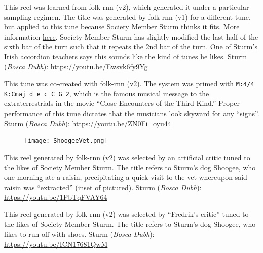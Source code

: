 \documentclass[a4paper,notitlepage,twoside]{book}
\begin{document}
{}  
\hypertarget{reel:MickeyFitternalys}{}
This reel was learned from folk-rnn (v2),
which generated it under a particular sampling regimen.
The title was generated by folk-rnn (v1) for a different tune, 
but applied to this tune because Society Member Sturm thinks it fits.
More information \href{https://highnoongmt.wordpress.com/2019/08/19/making-sense-of-the-folk-rnn-v2-model-part-11/}{here}.
Society Member Sturm has slightly modified the last half of the sixth bar of the turn 
such that it repeats the 2nd bar of the turn. 
One of Sturm's Irish accordion teachers says this sounds like the kind of tunes he likes.
Sturm ({\em Bosca Dubh}): \url{https://youtu.be/Ewsvk6fy9Yg}

{}  
\hypertarget{reel:CloseEncountersReel}{}
This tune was co-created with folk-rnn (v2).
The system was primed with {\tt M:4/4 K:Cmaj d e c C G 2},
which is the famous musical message to the extraterrestrials in 
the movie ``Close Encounters of the Third Kind.''
Proper performance of this tune dictates that the musicians look skyward for any ``signs''.
Sturm ({\em Bosca Dubh}): \url{https://youtu.be/ZN0Fi_oyu44}
  
{}  
  
\hypertarget{reel:DogRaisin}{}
\begin{figure}
\texttt{[image: ShoogeeVet.png]}
\end{figure}
This reel generated by folk-rnn (v2) was selected by an artificial critic 
tuned to the likes of Society Member Sturm.
The title refers to Sturm's dog Shoogee,
who one morning ate a raisin, 
precipitating a quick visit to the vet
whereupon said raisin was ``extracted'' (inset of pictured).
Sturm ({\em Bosca Dubh}): \url{https://youtu.be/1PbTqFVAY64}

\clearpage
{}
{}  
  
\hypertarget{reel:ShoogeeTakeAnotherShoe}{}
This reel generated by folk-rnn (v2) was selected by ``Fredrik's critic'' 
tuned to the likes of Society Member Sturm.
The title refers to Sturm's dog Shoogee,
who likes to run off with shoes. 
Sturm ({\em Bosca Dubh}): \url{https://youtu.be/ICN17681QwM}
\end{document}
